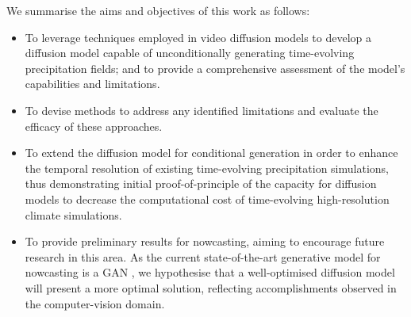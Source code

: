 \documentclass[ oneside,%
                    author={George Herbert},
                    degree={MSci},
                     title={Diffusion Models for Time-Evolving Precipitation Fields},
                  subtitle={}]{dissertation}
\begin{document}
We summarise the aims and objectives of this work as follows:
\begin{itemize}
      \item To leverage techniques employed in video diffusion models to develop a diffusion model capable of unconditionally generating time-evolving precipitation fields; and to provide a comprehensive assessment of the model's capabilities and limitations.
      \item To devise methods to address any identified limitations and evaluate the efficacy of these approaches.
      \item To extend the diffusion model for conditional generation in order to enhance the temporal resolution of existing time-evolving precipitation simulations, thus demonstrating initial proof-of-principle of the capacity for diffusion models to decrease the computational cost of time-evolving high-resolution climate simulations.
      \item To provide preliminary results for nowcasting, aiming to encourage future research in this area. As the current state-of-the-art generative model for nowcasting is a GAN \cite{Ravuri_Skillful_Precipitation_Nowcasting}, we hypothesise that a well-optimised diffusion model will present a more optimal solution, reflecting accomplishments observed in the computer-vision domain.
\end{itemize}

\end{document}

